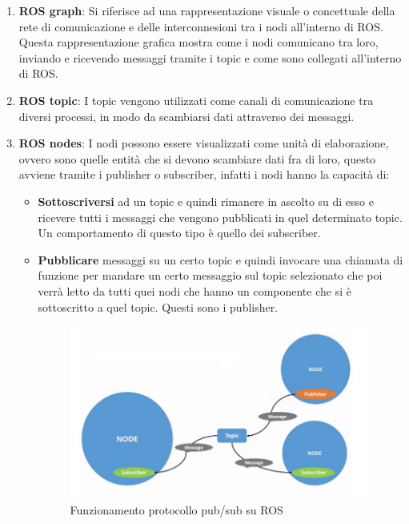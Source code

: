 \begin{enumerate}
\item \textbf{ROS graph}: Si riferisce ad una rappresentazione visuale o concettuale della rete
 di comunicazione e delle interconnesioni tra i nodi all’interno di ROS. Questa
 rappresentazione grafica mostra come i nodi comunicano tra loro, inviando e
 ricevendo messaggi tramite i topic e come sono collegati all’interno di ROS.
\item \textbf{ROS topic}: I topic vengono utilizzati come canali di comunicazione tra diversi processi, in modo da scambiarsi dati attraverso dei messaggi.
\item \textbf{ROS nodes}:  I nodi possono essere visualizzati come unità di elaborazione,
 ovvero sono quelle entità che si devono scambiare dati fra di loro, questo avviene tramite i publisher o subscriber, infatti i nodi hanno la capacità di:\\
 
\begin{itemize}

\item \textbf{Sottoscriversi} ad un topic e quindi rimanere in ascolto su di esso e ricevere tutti i messaggi che vengono pubblicati in quel determinato topic. Un comportamento di questo tipo è quello dei subscriber.
\item \textbf{Pubblicare}  messaggi su un certo topic e quindi invocare una chiamata di funzione per mandare un certo messaggio sul topic selezionato che poi verrà letto da tutti quei nodi che hanno un componente che si è sottoscritto a quel topic. Questi sono i publisher.

\begin{figure}[ht]
\centering
\includegraphics[width=\linewidth]{"images/nodi.jpg"}
\caption{Funzionamento protocollo pub/sub su ROS}
\label{fig:myImageLabel}
\end{figure}
\end{itemize}


\end{enumerate}
